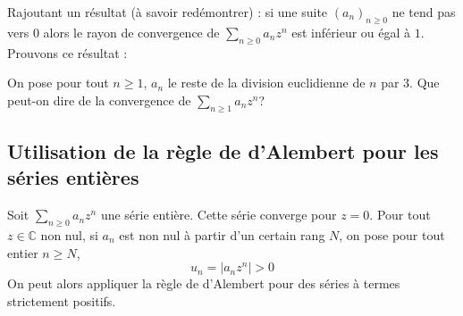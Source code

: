 \documentclass[french,11pt,twoside]{VcCours}
\begin{document}
%
%

\begin{Remarque}{} Rajoutant un résultat (à savoir redémontrer) : si une suite $(a_n)_{n \geq 0}$ ne tend pas vers $0$ alors le rayon de convergence de $\sum_{n \geq 0} a_n z^n$ est inférieur ou égal à $1$. Prouvons ce résultat : 

\vspace{2cm}
\end{Remarque}

\begin{Exemple}{} On pose pour tout $n \geq 1$, $a_n$ le reste de la division euclidienne de $n$ par $3$. Que peut-on dire de la convergence de $\sum_{n \geq 1} a_n z^n$?

\vspace{3cm}
\end{Exemple}

\subsection{Utilisation de la règle de d'Alembert pour les séries entières}
Soit $\sum_{n \geq 0} a_n z^n$ une série entière. Cette série converge pour $z=0$. Pour tout $z \in \mathbb{C}$ non nul, si $a_n$ est non nul à partir d'un certain rang $N$, on pose pour tout entier $n \geq N$,
$$ u_n = \vert a_n z^n \vert >0$$
On peut alors appliquer la règle de d'Alembert pour des séries à termes strictement positifs.

\medskip

%
\end{document}
